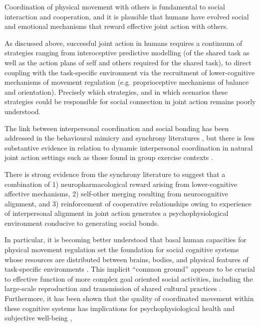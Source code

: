 \begin{CJK}{UTF8}{gbsn}
Coordination of physical movement with others is fundamental to social interaction and cooperation, and it is plausible that humans have evolved social and emotional mechanisms that reward effective joint action with others.

As discussed above, successful joint action in humans requires a continuum of strategies ranging from interoceptive predictive modelling (of the shared task as well as the action plans of self and others required for the shared task), to direct coupling with the task-specific environment via the recruitment of lower-cognitive mechanisms of movement regulation (e.g. proprioceptive mechanisms of balance and orientation).  Precisely which strategies, and in which scenarios these strategies could be responsible for social connection in joint action remains poorly understood.

The link between interpersonal coordination and social bonding has been addressed in the behavioural mimicry and synchrony literatures \citep[e.g.,][]{Wheatley2012,Launay2016,Mogan2017}, but there is less substantive evidence in relation to dynamic interpersonal coordination in natural joint action settings such as those found in group exercise contexts \citep{Marsh2009,Miles2009,Lumsden2012}.

There is strong evidence from the synchrony literature to suggest that a combination of 1) neuropharmacological reward arising from lower-cognitive affective mechanisms, 2) self-other merging resulting from neurocognitive alignment, and 3) reinforcement of cooperative relationships owing to experience of interpersonal alignment in joint action generates a psychophysiological environment conducive to generating social bonds.


In particular, it is becoming better understood that basal human capacities for physical movement regulation set the foundation for social cognitive systems whose resources are distributed between brains, bodies, and physical features of task-specific environments \citep{Hutchins2000,Kirsh2006,Semin2008,Semin2012,Coey2012}.  This implicit ``common ground'' appears to be crucial to effective function of more complex goal oriented social activities, including the large-scale reproduction and transmission of shared cultural practices \citep{Dunbar2012,Roepstorff2010,Claidiere2014,Launay2016}.  Furthermore, it has been shown that the quality of coordinated movement within these cognitive systems has implications for psychophysiological health and subjective well-being \citep{Wheatley2012},

















\end{CJK}
